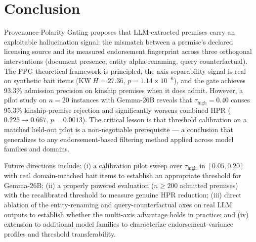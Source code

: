 \documentclass[11pt,letterpaper]{article}
\begin{document}
\section{Conclusion}

Provenance-Polarity Gating proposes that LLM-extracted premises carry an exploitable hallucination signal: the mismatch between a premise's declared licensing source and its measured endorsement fingerprint across three orthogonal interventions (document presence, entity alpha-renaming, query counterfactual). The PPG theoretical framework is principled, the axis-separability signal is real on synthetic bait items ($\mathrm{KW}\ H=27.36$, $p=1.14\times10^{-6}$), and the gate achieves 93.3\% admission precision on kinship premises when it does admit. However, a pilot study on $n=20$ instances with Gemma-26B reveals that $\tau_{\mathrm{high}}=0.40$ causes 95.3\% kinship-premise rejection and significantly worsens combined HPR ($0.225 \to 0.667$, $p=0.0013$). The critical lesson is that threshold calibration on a matched held-out pilot is a non-negotiable prerequisite --- a conclusion that generalizes to any endorsement-based filtering method applied across model families and domains.

Future directions include: (i) a calibration pilot sweep over $\tau_{\mathrm{high}}$ in $[0.05, 0.20]$ with real domain-matched bait items to establish an appropriate threshold for Gemma-26B; (ii) a properly powered evaluation ($n \geq 200$ admitted premises) with the recalibrated threshold to measure genuine HPR reduction; (iii) direct ablation of the entity-renaming and query-counterfactual axes on real LLM outputs to establish whether the multi-axis advantage holds in practice; and (iv) extension to additional model families to characterize endorsement-variance profiles and threshold transferability.



\end{document}
